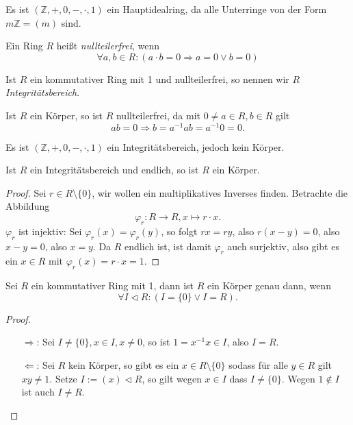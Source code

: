 \begin{example}
    Es ist $(\mathbb{Z}, +, 0, -, \cdot, 1)$ ein Hauptidealring, da alle Unterringe von der Form $m \mathbb{Z} = (m)$ sind.
\end{example}

\begin{definition}
    Ein Ring $R$ heißt \emph{nullteilerfrei}, wenn
    $$ \forall a, b \in R: (a \cdot b = 0 \Rightarrow a = 0 \lor b = 0) $$

    Ist $R$ ein kommutativer Ring mit 1 und nullteilerfrei, so nennen wir $R$ \emph{Integritätsbereich}.
\end{definition}

\begin{example}
    Ist $R$ ein Körper, so ist $R$ nullteilerfrei, da mit $0 \neq a \in R, b \in R$ gilt
    $$ a b = 0 \Rightarrow b = a^{-1} a b = a^{-1} 0 = 0. $$
\end{example}

\begin{example}
    Es ist $(\mathbb{Z}, +, 0, -, \cdot, 1)$ ein Integritätsbereich, jedoch kein Körper.
\end{example}

\begin{proposition}
    Ist $R$ ein Integritätsbereich und endlich, so ist $R$ ein Körper.
\end{proposition}

\begin{proof}
    Sei $r \in R \setminus \{0\}$, wir wollen ein multiplikatives Inverses finden. Betrachte die Abbildung
    $$ \varphi_r : R \to R, x \mapsto r \cdot x. $$
    $\varphi_r$ ist injektiv: Sei $\varphi_r(x) = \varphi_r(y)$, so folgt $rx = ry$, also $r(x-y) = 0$, also $x-y=0$, also $x=y$.
    Da $R$ endlich ist, ist damit $\varphi_r$ auch surjektiv, also gibt es ein $x \in R$ mit $\varphi_r(x) = r \cdot x = 1$.
\end{proof}

\begin{proposition}
    Sei $R$ ein kommutativer Ring mit 1, dann ist $R$ ein Körper genau dann, wenn
    $$ \forall I \vartriangleleft R: (I = \{0\} \lor I = R). $$
\end{proposition}

\begin{proof}{\ }
    \begin{itemize}
        \item[$\Rightarrow$:] Sei $I \neq \{0\}, x \in I, x \neq 0$, so ist $1 = x^{-1} x \in I$, also $I = R$.
        \item[$\Leftarrow$:] Sei $R$ kein Körper, so gibt es ein $x \in R \setminus \{0\}$ sodass für alle $y \in R$ gilt $xy \neq 1$. Setze $I := (x) \vartriangleleft R$, so gilt wegen $x \in I$ dass $I \neq \{0\}$. Wegen $1 \notin I$ ist auch $I \neq R$.
    \end{itemize}
\end{proof}

